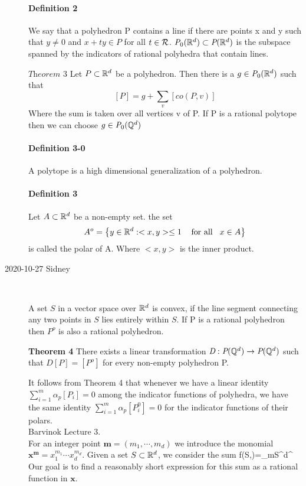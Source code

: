 \begin{description}
\paragraph{Definition  2}
We say that a polyhedron P contains a line if there are points x and y
such that $y\neq 0$ and $x+ty\in P$ for all $t\in\mathcal{R}$.
$\textit{P}_0(\mathbb{R}^d)\subset\textit{P}(\mathbb{R}^d)$ is the subspace
spanned by the indicators of rational polyhedra that contain lines.

$\textit{Theorem 3}$ Let $P\subset\mathbb{R}^d$ be a polyhedron. Then there is a $g\in\textit{P}_0(\mathbb{R}^d)$ such that
$$[P]=g+\sum_v[co(P,v)]$$
Where the sum is taken over all vertices v of P. If P is a rational polytope then we can choose $g\in\textit{P}_0({\mathbb{Q}}^d)$

\paragraph{Definition 3-0}
A polytope is a high dimensional generalization of a polyhedron.

\paragraph{Definition  3} Let $A\subset\mathbb{R}^d$ be a non-empty set. the set
$$A^o=\left\lbrace y\in\mathbb{R}^d:<x,y>\leq 1 \hspace{3mm}\mbox{ for all}\hspace{3mm}x\in A\right\rbrace$$
is called the polar of A. Where $<x,y>$ is the inner product.

\item[2020-10-27 Sidney]~

A set $S$ in a vector space over $\mathbb{R}^d$ is convex, if the line segment
connecting any two points in $S$ lies entirely within $S$. If P is a
rational polyhedron then $P^o$ is also a rational polyhedron.

\textbf{Theorem 4}
There exists a linear transformation
$\textit{D}:\textit{P}({\mathbb{Q}}^d)\rightarrow\textit{P}({\mathbb{Q}}^d)$ such that
$\textit{D}[P]=[P^o]$ for every non-empty polyhedron P.

It follows from Theorem 4 that whenever we have a linear identity
$\sum^m_{i=1}\alpha_p[P_i]=0$ among the indicator functions of polyhedra,
we have the same identity $\sum^m_{i=1}\alpha_p[P_i^0]=0$ for the
indicator functions of their polars.
\\

Barvinok Lecture 3.
\\
For an integer point $\mathbf{m}=(m_1,\cdots ,m_d)$ we introduce the monomial
$\mathbf{x}^\mathbf{m}=x_1^{m_1}\cdots x_d^{m_d}$. Given a set $S\subset
\mathbb{R}^d$, we consider the sum
\beq
f(S,)=\sum_{m\in S\cap\integers^d}^
Our goal is to find a reasonably short expression for this sum as a
rational function in $\mathbf{x}$.


\end{description}
